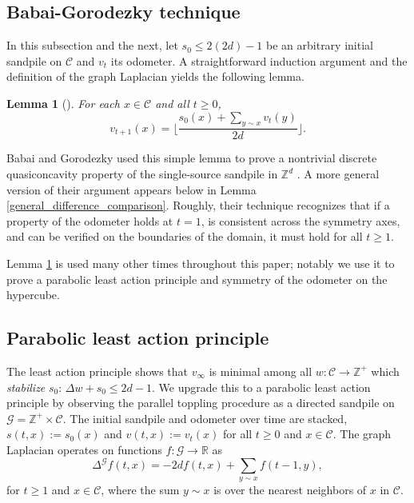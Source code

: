\documentclass[12pt]{amsart}
\newtheorem{lemma}[theorem]{Lemma}
\newcommand{\Z}{\mathbb{Z}}
\begin{document}
	
	\subsection{Babai-Gorodezky technique} 
	In this subsection and the next, let $s_0 \leq 2 (2 d) - 1$ be an arbitrary initial sandpile on $\mathcal{C}$ and $v_t$ its odometer. A straightforward induction argument and the definition of the graph Laplacian yields the following lemma. 
	\begin{lemma}[] \label{pt_ind_lemma}
		For each $x \in \mathcal{C}$ and all $t \geq 0$, 
		\begin{equation}
		v_{t+1}(x) =   \lfloor \frac{ s_0(x) + \sum_{y \sim x} v_{t}(y) }{2 d} \rfloor.
		\end{equation}
	\end{lemma}
	Babai and Gorodezky used this simple lemma to prove a nontrivial discrete quasiconcavity property of the single-source sandpile in $\Z^d$ \cite{babai2007sandpile}. A more general version of their argument appears below in Lemma \ref{general_difference_comparison}. Roughly, their technique recognizes that if a property of the odometer holds at $t=1$, is consistent across the symmetry axes, and can be verified on the boundaries of the domain, it must hold for all $t \geq 1$.
	
	Lemma \ref{pt_ind_lemma} is used many other times throughout this paper; notably we use it to prove a parabolic least action principle and symmetry of the odometer on the hypercube. 
	
	
	\subsection{Parabolic least action principle} 
	The least action principle \cite{fey2010growth} shows that $v_\infty$ is minimal among all $w: \mathcal{C} \to \mathbb{Z}^+$ which {\it stabilize} $s_0$: $\Delta w + s_0 \leq 2d -1$. We upgrade this to a parabolic least action principle by observing the parallel toppling procedure as a directed sandpile on $\mathcal{G} = \mathbb{Z}^+ \times \mathcal{C}$. The initial sandpile and odometer over time are stacked,
	$s(t,x) := s_0(x)$ and $v(t,x) := v_t(x)$ for all $t \geq 0$ and $x \in \mathcal{C}$.  The graph Laplacian operates on functions $f:\mathcal{G} \to \mathbb{R}$ as
	\begin{equation}
	\Delta^{\mathcal{G}} f(t,x) = -2 d f(t,x) + \sum_{y \sim x} f(t-1,y),
	\end{equation}
	for $t \geq 1$ and $x \in \mathcal{C}$, where the sum $y \sim x$ is over the nearest neighbors of $x$ in $\mathcal{C}$.
\end{document}
